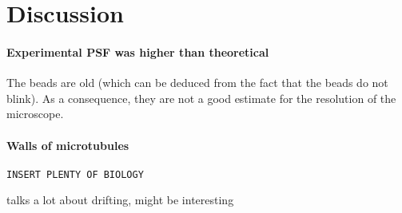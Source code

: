 \section{Discussion}
\paragraph{Experimental PSF was higher than theoretical}
The beads are old (which can be deduced from the fact that the beads do not blink).
As a consequence, they are not a good estimate for the resolution of the microscope.

\paragraph{Walls of microtubules}
\verb|INSERT PLENTY OF BIOLOGY|

\cite{martens_raw_2022} talks a lot about drifting, might be interesting